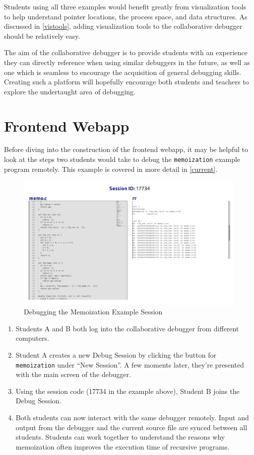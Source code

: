 \documentclass[12pt]{article}
\begin{document}
Students using all three examples would benefit greatly from
visualization tools to help understand pointer locations, the process
space, and data structures.  As discussed in \ref{vistools}, adding
visualization tools to the collaborative debugger should be relatively
easy.
\par 

The aim of the collaborative debugger is to provide students with an
experience they can directly reference when using similar debuggers in
the future, as well as one which is seamless to encourage the
acquisition of general debugging skills.  Creating such a platform
will hopefully encourage both students and teachers to explore the
undertaught area of debugging.

\section{Frontend Webapp}\label{webapp}

Before diving into the construction of the frontend webapp, it may be
helpful to look at the steps two students would take to debug the
\lstinline{memoization} example program remotely.  This example is
covered in more detail in \ref{current}.

\begin{figure}[h!]

  \includegraphics[width=\textwidth]{memoization}
  \centering
  \caption{Debugging the Memoization Example Session}
  \label{frontend:rrterm}
\end{figure}

\begin{enumerate}
\item Students A and B both log into the collaborative debugger from
  different computers.
\item Student A creates a new Debug Session by clicking the button for
  \lstinline{memoization} under ``New Session''.  A few moments later,
  they're presented with the main screen of the debugger.
\item Using the session code (17734 in the example above), Student B
  joins the Debug Session.
\item Both students can now interact with the same debugger remotely.
  Input and output from the debugger and the current source file are
  synced between all students.  Students can work together to
  understand the reasons why memoization often improves the execution
  time of recursive programs.
\end{enumerate}
\end{document}
